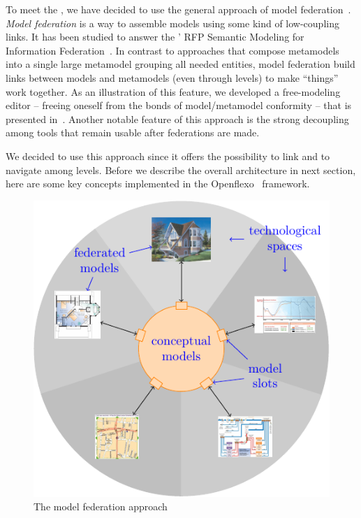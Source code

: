 

To meet the \mlpc, we have decided to use the general
approach of model federation~\parencite{Golra2016-federation}. \emph{Model
  federation} is a way to assemble models using some kind of
low-coupling links. It has been studied to answer the \OMG' RFP
Semantic Modeling for Information Federation~\parencite{simf}. In
contrast to approaches that compose metamodels into a single large
metamodel grouping all needed entities, model federation build links
between models and metamodels (even through levels) to make ``things''
work together. As an illustration of this feature, we developed a
free-modeling editor -- freeing oneself from the bonds of
model/metamodel conformity -- that is presented
in~\parencite{models2016-freemodel}. Another notable feature of
this approach is the strong decoupling among tools that remain usable
after federations are made.

We decided to use this approach since it offers the possibility to
link and to navigate among levels. Before we describe the overall
architecture in next section, here are some key concepts implemented
in the Openflexo~\parencite{openflexo_link} framework.


\begin{figure}[t]
    \centering
    \includegraphics[width=\columnwidth]{Figures/federation.pdf}
    \caption{The model federation approach}
    \label{fig:mf}
\end{figure}

